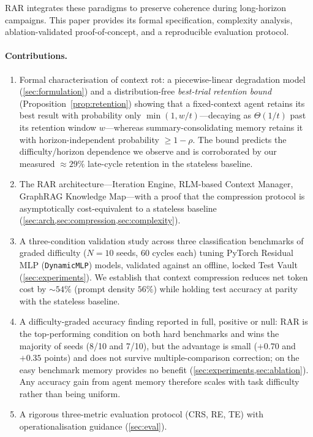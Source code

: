 \documentclass[conference]{IEEEtran}
\begin{document}
RAR integrates these paradigms to preserve coherence during long-horizon campaigns. This paper provides its formal specification, complexity analysis, ablation-validated proof-of-concept, and a reproducible evaluation protocol.

\paragraph{Contributions.}
\begin{enumerate}[label=\textbf{C\arabic*.},leftmargin=2.2em,itemsep=2pt]
  \item Formal characterisation of context rot: a piecewise-linear degradation model (\cref{sec:formulation}) and a distribution-free \emph{best-trial retention bound} (Proposition~\ref{prop:retention}) showing that a fixed-context agent retains its best result with probability only $\min(1,w/t)$---decaying as $\Theta(1/t)$ past its retention window $w$---whereas summary-consolidating memory retains it with horizon-independent probability $\ge 1-\rho$. The bound predicts the difficulty/horizon dependence we observe and is corroborated by our measured $\approx 29\%$ late-cycle retention in the stateless baseline.
  \item The RAR architecture---Iteration Engine, RLM-based Context Manager, GraphRAG Knowledge Map---with a proof that the compression protocol is asymptotically cost-equivalent to a stateless baseline (\cref{sec:arch,sec:compression,sec:complexity}).
  \item A three-condition validation study across three classification benchmarks of graded difficulty ($N{=}10$ seeds, 60 cycles each) tuning PyTorch Residual MLP (\texttt{DynamicMLP}) models, validated against an offline, locked Test Vault (\cref{sec:experiments}). We establish that context compression reduces net token cost by $\sim 54\%$ (prompt density $56\%$) while holding test accuracy at parity with the stateless baseline.
  \item A difficulty-graded accuracy finding reported in full, positive or null: RAR is the top-performing condition on both hard benchmarks and wins the majority of seeds (8/10 and 7/10), but the advantage is small ($+0.70$ and $+0.35$ points) and does not survive multiple-comparison correction; on the easy benchmark memory provides no benefit (\cref{sec:experiments,sec:ablation}). Any accuracy gain from agent memory therefore scales with task difficulty rather than being uniform.
  \item A rigorous three-metric evaluation protocol (CRS, RE, TE) with operationalisation guidance (\cref{sec:eval}).
\end{enumerate}
\end{document}
